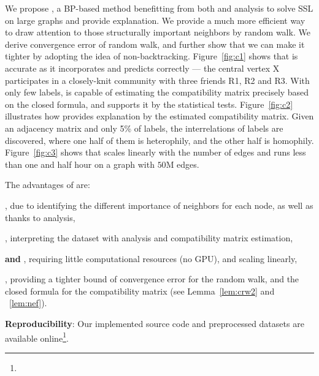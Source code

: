 We propose \method, a BP-based method benefitting from both \ndiff and \neteffect analysis to solve SSL on large graphs and provide explanation. 
We provide a much more efficient way to draw attention to those structurally important neighbors by random walk. We derive convergence error of random walk, and further show that we can make it tighter by adopting the idea of non-backtracking. Figure~\ref{fig:c1} shows that \method is accurate as it incorporates \ndiff and predicts correctly --- the central vertex X participates in a closely-knit community with three friends R1, R2 and R3. 
With only few labels, \method is capable of estimating the compatibility matrix precisely based on the closed formula, and supports it by the statistical tests. Figure~\ref{fig:c2} illustrates how \method provides explanation by the estimated compatibility matrix. Given an adjacency matrix and only 5\% of labels, the interrelations of labels are discovered, where one half of them is heterophily, and the other half is homophily.
Figure~\ref{fig:c3} shows that \method scales linearly with the number of edges and runs less than one and half hour on a graph with $50$M edges.

The advantages of \method are:
\bit
\item {\bf \Accurate}, due to \ndiff identifying the different importance of neighbors for each node, as well as thanks to \neteffect analysis,
\item {\bf \explain}, interpreting the dataset with \neteffect analysis and compatibility matrix estimation, 
\item {\bf \thrift \space and \scale}, requiring little computational resources (no GPU), and scaling linearly,
\item {\bf \theory}, providing a tighter bound of convergence error for the random walk, and the closed formula for the compatibility matrix (see Lemma~\ref{lem:crw2} and ~\ref{lem:nef}).
\eit

{\bf Reproducibility}: Our implemented source code and preprocessed datasets are available online\footnote{\codeurl}.

